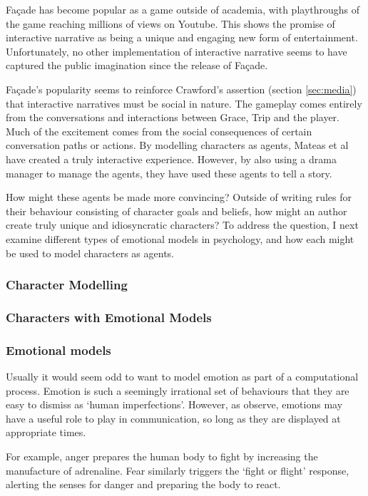 Fa\c{c}ade has become popular as a game outside of academia, with playthroughs of the game reaching millions of views on Youtube. This shows the promise of interactive narrative as being a unique and engaging new form of entertainment. Unfortunately, no other implementation of interactive narrative seems to have captured the public imagination since the release of Fa\c{c}ade.

Fa\c{c}ade's popularity seems to reinforce Crawford's assertion (section \ref{sec:media}) that interactive narratives must be social in nature. The gameplay comes entirely from the conversations and interactions between Grace, Trip and the player. Much of the excitement comes from the social consequences of certain conversation paths or actions. By modelling characters as agents, Mateas et al have created a truly interactive experience. However, by also using a drama manager to manage the agents, they have used these agents to tell a story.

How might these agents be made more convincing? Outside of writing rules for their behaviour consisting of character goals and beliefs, how might an author create truly unique and idiosyncratic characters? To address the question, I next examine different types of emotional models in psychology, and how each might be used to model characters as agents.

\subsubsection{Character Modelling}

\subsubsection{Characters with Emotional Models}

\subsubsection{Emotional models}\label{sec:emotional-models}
Usually it would seem odd to want to model emotion as part of a computational process. Emotion is such a seemingly irrational set of behaviours that they are easy to dismiss as `human imperfections'. However, as \citet{marsella2014} observe, emotions may have a useful role to play in communication, so long as they are displayed at appropriate times.

For example, anger prepares the human body to fight by increasing the manufacture of adrenaline. Fear similarly triggers the `fight or flight' response, alerting the senses for danger and preparing the body to react.

